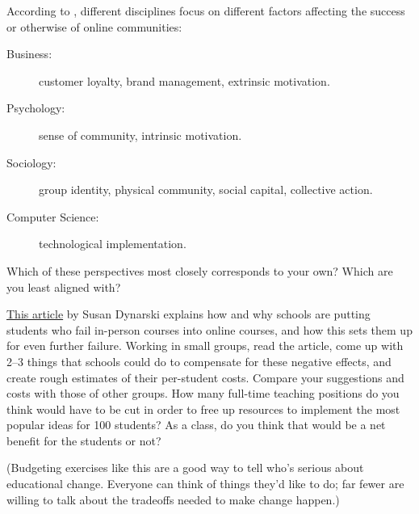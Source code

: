 
According to \cite{Irib2009}, different disciplines focus on different
factors affecting the success or otherwise of online communities:

\begin{description}

  \item[Business:] customer loyalty, brand management, extrinsic
    motivation.

  \item[Psychology:] sense of community, intrinsic motivation.

  \item[Sociology:] group identity, physical community, social
    capital, collective action.

  \item[Computer Science:] technological implementation.

\end{description}

\noindent
Which of these perspectives most closely corresponds to your own?
Which are you least aligned with?


\href{https://www.nytimes.com/2018/01/19/business/online-courses-are-harming-the-students-who-need-the-most-help.html}{This
  article} by Susan Dynarski explains how and why schools are putting
students who fail in-person courses into online courses, and how this
sets them up for even further failure. Working in small groups, read
the article, come up with 2--3 things that schools could do to
compensate for these negative effects, and create rough estimates of
their per-student costs.  Compare your suggestions and costs with
those of other groups.  How many full-time teaching positions do you
think would have to be cut in order to free up resources to implement
the most popular ideas for 100 students?  As a class, do you think
that would be a net benefit for the students or not?

(Budgeting exercises like this are a good way to tell who's serious
about educational change.  Everyone can think of things they'd like to
do; far fewer are willing to talk about the tradeoffs needed to make
change happen.)
